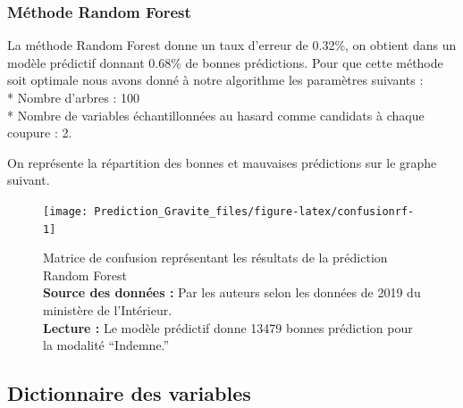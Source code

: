 \documentclass[french,]{tp}
\begin{document}
\newpage

\hypertarget{random-forest}{%
\subsubsection{Méthode Random Forest}\label{random-forest}}

La méthode Random Forest donne un taux d'erreur de 0.32\%, on obtient dans un modèle prédictif donnant 0.68\% de bonnes prédictions. Pour que cette méthode soit optimale nous avons donné à notre algorithme les paramètres suivants :\\
* Nombre d'arbres : 100\\
* Nombre de variables échantillonnées au hasard comme candidats à chaque coupure : 2.

On représente la répartition des bonnes et mauvaises prédictions sur le graphe suivant.

\begin{figure}[ht!]

{\centering \texttt{[image: Prediction\_Gravite\_files/figure-latex/confusionrf-1]} 

}

\caption{Matrice de confusion représentant les résultats de la prédiction Random Forest\\
\textbf{Source des données :} Par les auteurs selon les données de 2019 du ministère de l'Intérieur.\\
\textbf{Lecture :} Le modèle prédictif donne 13479 bonnes prédiction pour la modalité ``Indemne.''}\label{fig:confusionrf}
\end{figure}





\newpage

\hypertarget{dico-var}{%
\subsection{Dictionnaire des variables}\label{dico-var}}
\end{document}
